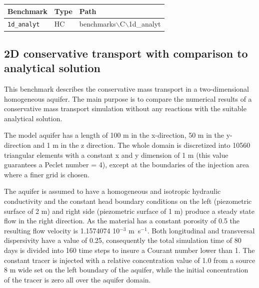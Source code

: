 \begin{table}[htbp]
\centering
\begin{tabular}{|l|l|l|}
\hline
Benchmark & Type & Path \\
\hline
\texttt{1d\_analyt}& HC &  benchmarks$\backslash$C$\backslash$1d\_analyt  \\			
\hline
\end{tabular}
\label{path}
\end{table}


\subsection[2D conservative transport]{2D conservative transport with comparison to analytical solution}
\label{l_s_benchmark_2d}

This benchmark describes the conservative mass transport in a two-dimensional homogeneous aquifer. The main purpose is to compare the numerical results of a conservative mass transport simulation without any reactions with the suitable analytical solution.

The model aquifer has a length of 100 m in the x-direction, 50 m in the y-direction and 1 m in the z direction. The whole domain is discretized into 10560 triangular elements with a constant x and y dimension of 1 m (this value guarantees a Peclet number = 4), except at the boundaries of the injection area where a finer grid is chosen.

The aquifer is assumed to have a homogeneous and isotropic hydraulic conductivity and the constant head boundary conditions on the left (piezometric surface of 2 m) and right side (piezometric surface of 1 m) produce a steady state flow in the right direction. As the material has a constant porosity of 0.5 the resulting flow velocity is 1.1574074 10$^{-3}$ m~s$^{-1}$. Both longitudinal and transversal dispersivity have a value of 0.25, consequently the total simulation time of 80 days is divided into 160 time steps to insure a Courant number lower than 1.
The constant tracer is injected with a relative concentration value of 1.0 from a source 8 m wide set on the left boundary of the aquifer, while the initial concentration of the tracer is zero all over the aquifer domain.

